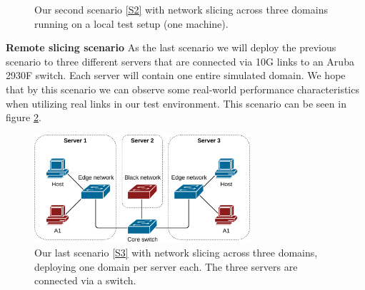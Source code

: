 \begin{description}[style=multiline, labelwidth=0.7cm]
\begin{figure}[ht]
        \caption[Validation Scenario 2]{Our second scenario \ref{S2} with network slicing across three domains running on a local test setup (one machine).}
        \label{fig:scenario_2}
    \end{figure}
    \item[\namedlabel{S3}{S3}] \textbf{Remote slicing scenario} As the last scenario we will deploy the previous scenario to three different servers that are connected via 10G links to an Aruba 2930F switch. Each server will contain one entire simulated domain. We hope that by this scenario we can observe some real-world performance characteristics when utilizing real links in our test environment. This scenario can be seen in figure \ref{fig:scenario_3}.
    \begin{figure}[ht]
        \centering
        \includegraphics[width=8cm]{images/chapter_7/scenario_3.png}
        \caption[Validation Scenario 3]{Our last scenario \ref{S3} with network slicing across three domains, deploying one domain per server each. The three servers are connected via a switch.}
        \label{fig:scenario_3}
    \end{figure}
\end{description}



